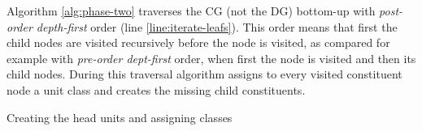    Algorithm \ref{alg:phase-two} traverses the CG (not the DG) bottom-up with \textit{post-order depth-first} order (line \ref{line:iterate-leafs}). This order means that first the child nodes are visited recursively before the node is visited, as compared for example with \textit{pre-order dept-first} order, when first the node is visited and then its child nodes. During this traversal algorithm assigns to every visited constituent node a unit class and creates the missing child constituents.

    \begin{algorithm}[!ht]
        \Input {\cg, \dg}
        \caption{Creating the head units and assigning classes}
        \label{alg:phase-two}
    \end{algorithm}

